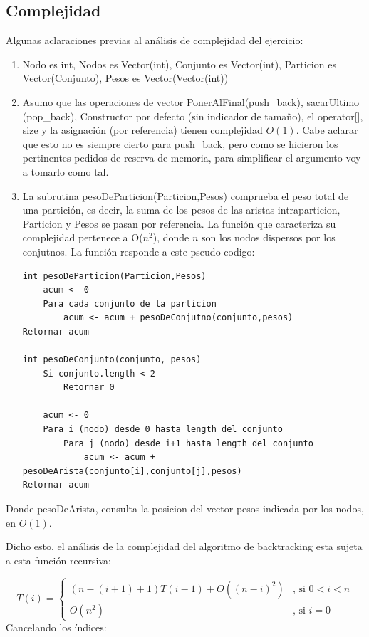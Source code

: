 \documentclass[10pt,a4paper]{article}
\begin{document}
\subsection{Complejidad}

Algunas aclaraciones previas al análisis de complejidad del ejercicio:

\begin{enumerate}

\item Nodo es int, Nodos es Vector(int), Conjunto es Vector(int), Particion es Vector(Conjunto), Pesos es Vector(Vector(int))
\item Asumo que las operaciones de vector PonerAlFinal(push\_back), sacarUltimo (pop\_back), Constructor por defecto (sin indicador de tamaño), el operator[], size y la asignación (por referencia) tienen complejidad $O(1)$. Cabe aclarar que esto no es siempre cierto para push\_back, pero como se hicieron los pertinentes pedidos de reserva de memoria, para simplificar el argumento voy a tomarlo como tal.
\item La subrutina pesoDeParticion(Particion,Pesos) comprueba el peso total de una partición, es decir, la suma de los pesos de las aristas intraparticion, Particion y Pesos se pasan por referencia. La función que caracteriza su complejidad pertenece a O($n^2$), donde $n$ son los nodos dispersos por los conjutnos. La función responde a este pseudo codigo:
\bigskip
\begin{lstlisting}
int pesoDeParticion(Particion,Pesos)
	acum <- 0
	Para cada conjunto de la particion
		acum <- acum + pesoDeConjutno(conjunto,pesos)
Retornar acum
		
int pesoDeConjunto(conjunto, pesos)
	Si conjunto.length < 2
		Retornar 0
	
	acum <- 0
	Para i (nodo) desde 0 hasta length del conjunto
		Para j (nodo) desde i+1 hasta length del conjunto
			acum <- acum + pesoDeArista(conjunto[i],conjunto[j],pesos)
Retornar acum
\end{lstlisting}
\end{enumerate}

Donde pesoDeArista, consulta la posicion del vector pesos indicada por los nodos, en $O(1)$.

Dicho esto, el análisis de la complejidad del algoritmo de backtracking esta sujeta a esta función recursiva:

\[ T(i) = \left\{ \begin{array}{ll}
         (n-(i+1)+1)T(i-1) + O((n-i)^2) & \mbox{, si $0 < i < n$}\\
         O(n^2) & \mbox{, si $i = 0$}\end{array} \right. \]
Cancelando los índices:
\end{document}
